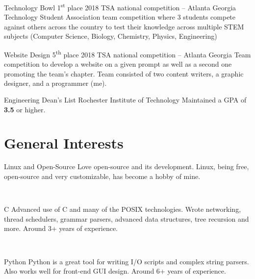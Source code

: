 \documentclass[print]{cv-style}          %
\begin{document}
\begin{entrylist}
\entry
{}
{Technology Bowl 1\textsuperscript{st} place}
{2018 TSA national competition -- Atlanta Georgia}
{Technology Student Association team competition where 3 students compete against others across the country to test their knowledge across multiple STEM subjects (Computer Science, Biology, Chemistry, Physics, Engineering)}

\end{entrylist}
\begin{entrylist}

\entry
{}
{Website Design 5\textsuperscript{th} place}
{2018 TSA national competition -- Atlanta Georgia}
{Team competition to develop a website on a given prompt as well as a second one promoting the team's chapter. Team consisted of two content writers, a graphic designer, and a programmer (me).}


\end{entrylist}
\begin{entrylist}

\entry
{}
{Engineering Dean's List}
{Rochester Institute of Technology}
{Maintained a GPA of \textbf{3.5} or higher.}

\end{entrylist}


\section{General Interests}
  \vspace{-0.3cm}
\begin{entrylist}
\entry
{}
{Linux and Open-Source}
{}
{Love open-source and its development. Linux, being free, open-source and very customizable, has become a hobby of mine. }

\end{entrylist}\
\begin{entrylist}
\entry
{}
{C}
{}
{Advanced use of C and many of the POSIX technologies. Wrote networking, thread schedulers, grammar parsers, advanced data structures, tree recursion and more. Around 3+ years of experience.}
\end{entrylist}\
\begin{entrylist}
\entry
{}
{Python}
{}
{Python is a great tool for writing I/O scripts and complex string parsers. Also works well for front-end GUI design. Around 6+ years of experience.}

\end{entrylist}\
\end{document}
